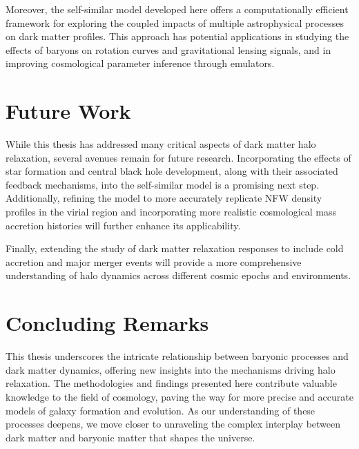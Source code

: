 Moreover, the self-similar model developed here offers a computationally efficient framework for exploring the coupled impacts of multiple astrophysical processes on dark matter profiles. This approach has potential applications in studying the effects of baryons on rotation curves and gravitational lensing signals, and in improving cosmological parameter inference through emulators.

\section*{Future Work}
While this thesis has addressed many critical aspects of dark matter halo relaxation, several avenues remain for future research. Incorporating the effects of star formation and central black hole development, along with their associated feedback mechanisms, into the self-similar model is a promising next step. Additionally, refining the model to more accurately replicate NFW density profiles in the virial region and incorporating more realistic cosmological mass accretion histories will further enhance its applicability.

Finally, extending the study of dark matter relaxation responses to include cold accretion and major merger events will provide a more comprehensive understanding of halo dynamics across different cosmic epochs and environments.

\section*{Concluding Remarks}
This thesis underscores the intricate relationship between baryonic processes and dark matter dynamics, offering new insights into the mechanisms driving halo relaxation. The methodologies and findings presented here contribute valuable knowledge to the field of cosmology, paving the way for more precise and accurate models of galaxy formation and evolution. As our understanding of these processes deepens, we move closer to unraveling the complex interplay between dark matter and baryonic matter that shapes the universe.
